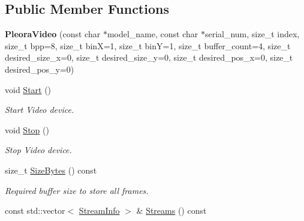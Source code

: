 \subsection*{Public Member Functions}
\begin{DoxyCompactItemize}
\item 
{\bfseries Pleora\+Video} (const char $\ast$model\+\_\+name, const char $\ast$serial\+\_\+num, size\+\_\+t index, size\+\_\+t bpp=8, size\+\_\+t binX=1, size\+\_\+t binY=1, size\+\_\+t buffer\+\_\+count=4, size\+\_\+t desired\+\_\+size\+\_\+x=0, size\+\_\+t desired\+\_\+size\+\_\+y=0, size\+\_\+t desired\+\_\+pos\+\_\+x=0, size\+\_\+t desired\+\_\+pos\+\_\+y=0)\hypertarget{classpangolin_1_1_pleora_video_af5de7d30e0b8287d2c63386610ead49b}{}\label{classpangolin_1_1_pleora_video_af5de7d30e0b8287d2c63386610ead49b}

\item 
void \hyperlink{classpangolin_1_1_pleora_video_a577b97426c315ddeb29446fcd1c8acda}{Start} ()\hypertarget{classpangolin_1_1_pleora_video_a577b97426c315ddeb29446fcd1c8acda}{}\label{classpangolin_1_1_pleora_video_a577b97426c315ddeb29446fcd1c8acda}

\begin{DoxyCompactList}\small\item\em Start Video device. \end{DoxyCompactList}\item 
void \hyperlink{classpangolin_1_1_pleora_video_aed12ed85d97d258096a8e6ce19c048e2}{Stop} ()\hypertarget{classpangolin_1_1_pleora_video_aed12ed85d97d258096a8e6ce19c048e2}{}\label{classpangolin_1_1_pleora_video_aed12ed85d97d258096a8e6ce19c048e2}

\begin{DoxyCompactList}\small\item\em Stop Video device. \end{DoxyCompactList}\item 
size\+\_\+t \hyperlink{classpangolin_1_1_pleora_video_af608d7d12abeb6a941f4f1d2de914e8e}{Size\+Bytes} () const \hypertarget{classpangolin_1_1_pleora_video_af608d7d12abeb6a941f4f1d2de914e8e}{}\label{classpangolin_1_1_pleora_video_af608d7d12abeb6a941f4f1d2de914e8e}

\begin{DoxyCompactList}\small\item\em Required buffer size to store all frames. \end{DoxyCompactList}\item 
const std\+::vector$<$ \hyperlink{classpangolin_1_1_stream_info}{Stream\+Info} $>$ \& \hyperlink{classpangolin_1_1_pleora_video_a25e41a13969a979657343971d97043aa}{Streams} () const \hypertarget{classpangolin_1_1_pleora_video_a25e41a13969a979657343971d97043aa}{}\label{classpangolin_1_1_pleora_video_a25e41a13969a979657343971d97043aa}


\end{DoxyCompactItemize}
